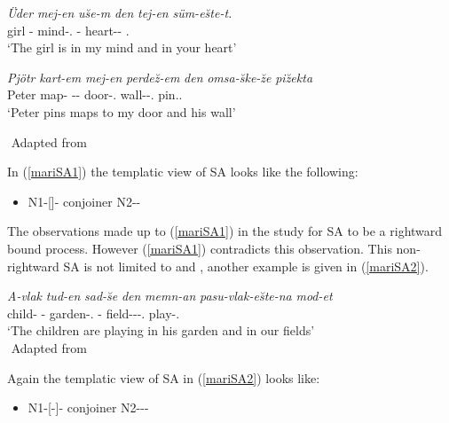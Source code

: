 \begin{exe}
    \ex \label{mariSA1}
    \begin{xlist}
        \ex
        \gll
        \textit{Üder} \textit{mej-en} \textit{u\u{s}e-m} \textit{den} \textit{tej-en} \textit{süm-e\u{s}te-t.} \\ girl  {\Fsg}-{\Gen} mind-{\Poss}.{\Fsg} {\And}  {\Ssg}-{\Gen} heart-{\Iness}- {\Ssg}.{\Poss} \\
        \glt `The girl is in my mind and in your heart'
        
        \ex 
        \gll 
        \textit{Pjötr} \textit{kart-em} \textit{mej-en} \textit{perde\u{z}-em} \textit{den} \textit{omsa-\u{s}ke-\u{z}e} \textit{pi\u{z}ekta} \\ Peter map-{\Acc}  {\Fsg}-{\Pron}-{\Gen} door-{\Poss}.{\Fsg} {\And} wall-{\Ill}-{\Poss}.{\Tsg} pin.{\Third}{\Sg}.{\Prs} \\
        \glt `Peter pins maps to my door and his wall'
    \end{xlist}
    ${}$ \hfill Adapted from \cite{guseva2017postsyntactic}
\end{exe}

In (\ref{mariSA1}) the templatic view of SA looks like the following:
\begin{itemize}
    \item N1-[{\Lcase}]-{\Poss} conjoiner N2-{\Lcase}-{\Poss}
\end{itemize}

The observations made up to (\ref{mariSA1}) in the study for SA to be a rightward bound process. However (\ref{mariSA1}) contradicts this observation. This non-rightward SA is not limited to {\Poss} and {\Lcase}, another example is given in (\ref{mariSA2}).
\begin{exe}
    \ex \label{mariSA2}
    \gll 
    \textit{A-vlak} \textit{tud-en} \textit{sad-\u{s}e} \textit{den} \textit{memn-an} \textit{pasu-vlak-e\u{s}te-na} \textit{mod-et} \\ child-{\Pl} {\Third}{\Sg}-{\Gen} garden-{\Third}{\Sg}.{\Poss} {\And} {\First}{\Pl}-{\Gen} field-{\Pl}-{\Iness}-{\First}{\Pl}.{\Poss} play-{\Third}{\Pl}.{\Prs} \\
    \glt `The children are playing in his garden and in our fields'  \\
    ${}$ \hfill Adapted from \cite{guseva2017postsyntactic}
\end{exe}

Again the templatic view of SA in (\ref{mariSA2}) looks like:
\begin{itemize}
    \item N1-[{\Pl}-{\Iness}]-{\Poss} conjoiner N2-{\Pl}-{\Iness}-{\Poss}
\end{itemize}

